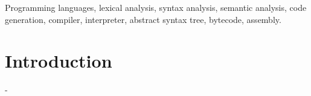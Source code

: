 \documentclass[journal]{IEEEtran}
\begin{document}







\maketitle

\begin{abstract}
\end{abstract}

\begin{IEEEkeywords}
Programming languages, lexical analysis, syntax analysis, semantic analysis, code generation, compiler, interpreter, abstract syntax tree, bytecode, assembly.
\end{IEEEkeywords}






%
\IEEEpeerreviewmaketitle



\section{Introduction}
% 
% 
% 
% 
-
\end{document}
